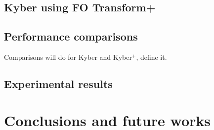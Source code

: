\documentclass[floatrow,journal=tches,submission]{iacrtrans}
\begin{document}
\subsection{Kyber using FO Transform+}
\subsection{Performance comparisons}\label{sec:exp-results}
% 
Comparisons will do for Kyber and Kyber$^+$, define it. 

\subsection{Experimental results}


\section{Conclusions and future works}\label{sec:future-works}



\end{document}
